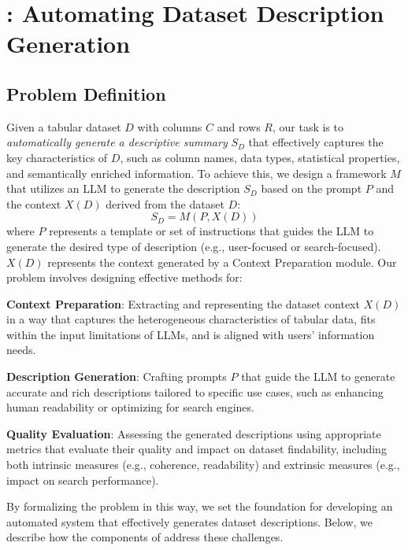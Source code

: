 \section{\AutoDatasetDescriptoinGenerationAbbrev: Automating Dataset Description Generation}
\label{sec:auto_ddg}

\subsection{Problem Definition}
\label{sec:problem_definition}

% 
Given a tabular dataset $D$ with columns $C$ and rows $R$, our task is to \emph{automatically generate a descriptive summary} $S_D$ that effectively captures the key characteristics of $D$, such as column names, data types, statistical properties, and semantically enriched information.
% 
To achieve this, we design a framework $M$ that utilizes an LLM to generate the description $S_D$ based on the prompt $P$ and the context $X(D)$ derived from the dataset $D$:
$$
S_D = M(P, X(D))
$$
where $P$ represents a template or set of instructions that guides the LLM to generate the desired type of description (e.g., user-focused or search-focused). $X(D)$ represents the context generated by a Context Preparation module. Our problem involves designing effective methods for:

\noindent\textbf{Context Preparation}: Extracting and representing the dataset context $X(D)$ in a way that captures the heterogeneous characteristics of tabular data, fits within the input limitations of LLMs, and is aligned with users' information needs.

\noindent \textbf{Description Generation}: Crafting prompts $P$ that guide the LLM to generate accurate and rich descriptions tailored to specific use cases, such as enhancing human readability 
or optimizing for search engines.

\noindent \textbf{Quality Evaluation}: Assessing the generated descriptions using appropriate metrics that evaluate their quality and impact on dataset findability, including both intrinsic measures (e.g., coherence, readability) and extrinsic measures (e.g., impact on search performance).

By formalizing the problem in this way, we set the foundation for developing an automated system that effectively generates dataset descriptions. 
%
Below, we describe how the components of \SystemName address these challenges.
% 

